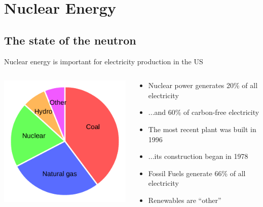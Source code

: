 \documentclass{beamer}
\begin{document}
\section{Nuclear Energy}

\subsection{The state of the neutron}

    \begin{frame}{Nuclear energy is important for electricity production in the US}

        \begin{columns}[T]

            \begin{column}{0.5\textwidth}
                \includegraphics{./img/sources.pdf}
            \end{column}

            \begin{column}{0.5\textwidth}
                \begin{itemize}
                    \item Nuclear power generates 20\% of all electricity
                    \pause
                    \item ...and 60\% of carbon-free electricity
                    \pause
                    \item The most recent plant was built in 1996
                    \pause
                    \item ...its construction began in 1978
                    \pause
                    \item Fossil Fuels generate 66\% of all electricity
                    \pause
                    \item Renewables are ``other''
                \end{itemize}
            \end{column}

        \end{columns}

    \end{frame}
\end{document}
